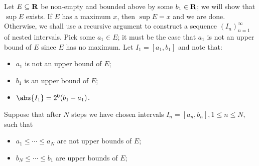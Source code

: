 \documentclass{lew98_solutions}
\begin{document}
\begin{solution}
    Let \( E \subseteq \mathbf{R} \) be non-empty and bounded above by some \( b_1 \in \mathbf{R} \); we will show that \( \sup E \) exists. If \( E \) has a maximum \( x \), then \( \sup E = x \) and we are done. Otherwise, we shall use a recursive argument to construct a sequence \( (I_n)_{n=1}^{\infty} \) of nested intervals. Pick some \( a_1 \in E \); it must be the case that \( a_1 \) is not an upper bound of \( E \) since \( E \) has no maximum. Let \( I_1 = [a_1, b_1] \) and note that:
    \begin{itemize}
        \item \( a_1 \) is not an upper bound of \( E \);

        \item \( b_1 \) is an upper bound of \( E \);

        \item \( \abs{I_1} = 2^0 (b_1 - a_1) \).
    \end{itemize}
    Suppose that after \( N \) steps we have chosen intervals \( I_n = [a_n, b_n], 1 \leq n \leq N \), such that
    \begin{itemize}
        \item \( a_1 \leq \cdots \leq a_N \) are not upper bounds of \( E \);

        \item \( b_N \leq \cdots \leq b_1 \) are upper bounds of \( E \);


\end{itemize}
\end{solution}
\end{document}
